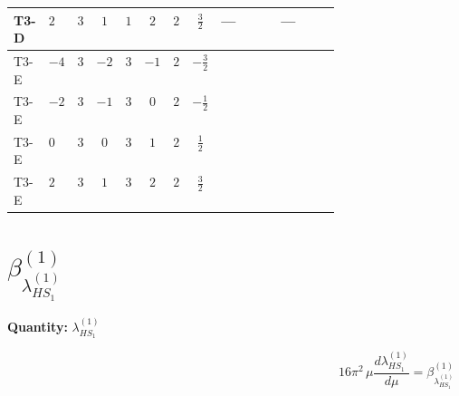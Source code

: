 \documentclass[8pt]{article}
\begin{document}
\begin{landscape}
\begin{longtable}{@{}llcccccc >{\raggedright\arraybackslash}p{0.21\linewidth} >{\raggedright\arraybackslash}p{0.21\linewidth}@{}}
\midrule
T3-D & $2$ & $3$ & $1$ & $1$ & $2$ & $2$ & $\frac{3}{2}$ & --- & --- \\
\midrule
T3-E & $-4$ & $3$ & $-2$ & $3$ & $-1$ & $2$ & $-\frac{3}{2}$ & \scriptsize\adjustbox{max width=\linewidth}{$\begin{gathered} +6 {\lambda_{12}^{(A)}}^2\end{gathered}$} & \scriptsize\adjustbox{max width=\linewidth}{$\begin{gathered} +6 {\lambda_{12}^{(\times)}}^2\end{gathered}$} \\
\midrule
T3-E & $-2$ & $3$ & $-1$ & $3$ & $0$ & $2$ & $-\frac{1}{2}$ & \scriptsize\adjustbox{max width=\linewidth}{$\begin{gathered} +6 {\lambda_{12}^{(A)}}^2\end{gathered}$} & \scriptsize\adjustbox{max width=\linewidth}{$\begin{gathered} +6 {\lambda_{12}^{(\times)}}^2\end{gathered}$} \\
\midrule
T3-E & $0$ & $3$ & $0$ & $3$ & $1$ & $2$ & $\frac{1}{2}$ & \scriptsize\adjustbox{max width=\linewidth}{$\begin{gathered} +6 {\lambda_{12}^{(A)}}^2\end{gathered}$} & \scriptsize\adjustbox{max width=\linewidth}{$\begin{gathered} +6 {\lambda_{12}^{(\times)}}^2\end{gathered}$} \\
\midrule
T3-E & $2$ & $3$ & $1$ & $3$ & $2$ & $2$ & $\frac{3}{2}$ & \scriptsize\adjustbox{max width=\linewidth}{$\begin{gathered} +6 {\lambda_{12}^{(A)}}^2\end{gathered}$} & \scriptsize\adjustbox{max width=\linewidth}{$\begin{gathered} +6 {\lambda_{12}^{(\times)}}^2\end{gathered}$} \\
\midrule
\bottomrule
\end{longtable}
\clearpage
\section*{$\beta_{\lambda_{HS_1}^{(1)}}^{(1)}$}
\noindent\textbf{Quantity: }$\lambda_{HS_1}^{(1)}$\par\smallskip
\[16\pi^2\,\mu\frac{d \lambda_{HS_1}^{(1)}}{d\mu}=\beta_{\lambda_{HS_1}^{(1)}}^{(1)}\]

\end{landscape}
\end{document}
